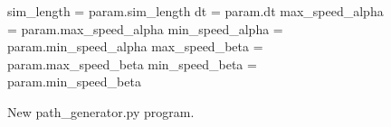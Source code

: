 \begin{figure}[h]
\begin{center}
	\scriptsize{
	\begin{python}
sim_length = param.sim_length
dt = param.dt
max_speed_alpha = param.max_speed_alpha
min_speed_alpha = param.min_speed_alpha
max_speed_beta = param.max_speed_beta
min_speed_beta = param.min_speed_beta
	\end{python}
	}
	\caption{New path_generator.py program.}
	\label{}
\end{center}
\end{figure}